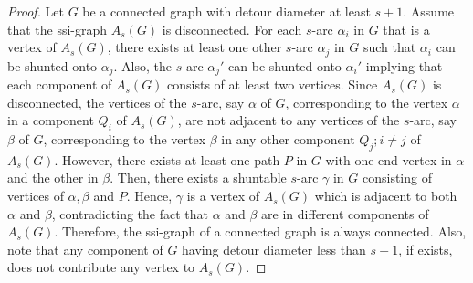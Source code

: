 \documentclass[10pt,a4paper]{amsart}
\begin{document}
\begin{proof}
	Let $G$ be a connected graph with detour diameter at least $s+1$. Assume that the ssi-graph $A_{s}(G)$ is disconnected. For each $s$-arc $\alpha_{i}$ in $G$ that is a vertex of $A_{s}(G)$, there exists at least one other $s$-arc $\alpha_{j}$ in $G$ such that $\alpha_{i}$ can be shunted onto $\alpha_{j}$. Also, the $s$-arc $\alpha_{j}'$ can be shunted onto $\alpha_{i}'$ implying that each component of $A_{s}(G)$ consists of at least two vertices. Since $A_{s}(G)$ is disconnected, the vertices of the $s$-arc, say $\alpha$ of $G$, corresponding to the vertex $\alpha$ in a component $Q_{i}$ of $A_{s}(G)$, are not adjacent to any vertices of the $s$-arc, say $\beta$ of $G$, corresponding to the vertex $\beta$ in any other component $Q_{j};i\ne j$ of $A_{s}(G)$. However, there exists at least one path $P$ in $G$ with one end vertex in $\alpha$ and the other in $\beta$. Then, there exists a shuntable $s$-arc $\gamma$ in $G$ consisting of vertices of $\alpha,\beta$ and $P$. Hence, $\gamma$ is a vertex of $A_{s}(G)$ which is adjacent to both $\alpha$ and $\beta$, contradicting the fact that $\alpha$ and $\beta$ are in different components of $A_{s}(G)$. Therefore, the ssi-graph of a connected graph is always connected. Also, note that any component of $G$ having detour diameter less than $s+1$, if exists, does not contribute any vertex to $A_{s}(G)$. %
	

\end{proof}
\end{document}
